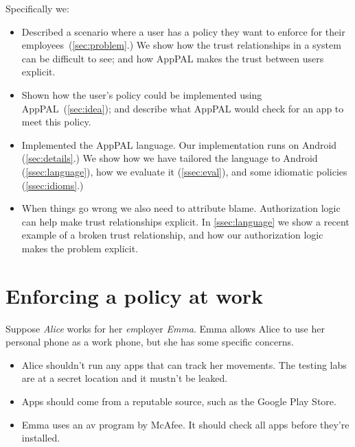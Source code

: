 \documentclass[]{scrartcl}
\begin{document}
Specifically we:
\begin{itemize}
  \item
    Described a scenario where a user has a policy they want to enforce for their employees~(\autoref{sec:problem}.)
    We show how the trust relationships in a system can be difficult to see;
      and how AppPAL makes the trust between users explicit.
  \item
    Shown how the user's policy could be implemented using AppPAL~(\autoref{sec:idea});
      and describe what AppPAL would check for an app to meet this policy.

  \item Implemented the AppPAL language.
    Our implementation runs on Android (\autoref{sec:details}.)
    We show how we have tailored the language to Android (\autoref{ssec:language}),
      how we evaluate it (\autoref{ssec:eval}),
      and some idiomatic policies (\autoref{ssec:idioms}.)

  \item When things go wrong we also need to attribute blame.
    Authorization logic can help make trust relationships explicit.
    In \autoref{ssec:language} we show a recent example of a broken trust relationship,
    and how our authorization logic makes the problem explicit.

\end{itemize}

\section{Enforcing a policy at work}
\label{sec:problem}

Suppose \emph{Alice} works for her \emph{em\/}ployer \emph{Emma}.
Emma allows Alice to use her personal phone as a work phone, but she has some specific concerns.
\begin{itemize}
  \item Alice shouldn't run any apps that can track her movements.
    The testing labs are at a secret location and it mustn't be leaked.
  \item Apps should come from a reputable source, such as the Google Play Store.
  \item Emma uses an \ac{av} program by McAfee.
    It should check all apps before they're installed.
\end{itemize}
\end{document}
